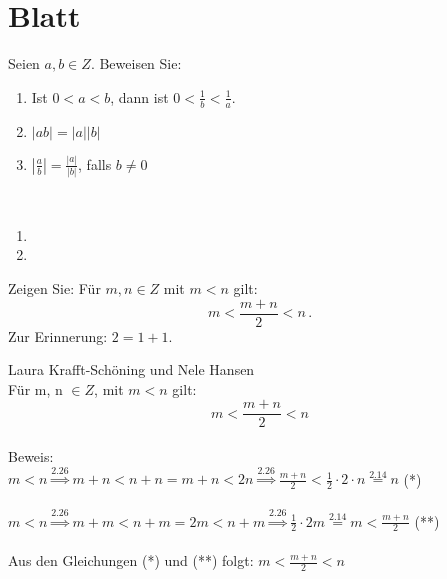 \section{Blatt}

\begin{aufg}[6 Punkte]\label{kleiner}
Seien $a,b\in Z$. Beweisen Sie: 
\begin{enumerate}[label=$\mathrm{(\roman*)}$, ref=$\mathrm{\roman*}$]
\item\label{kleineri} Ist $0<a<b$, dann ist $0<\frac1b<\frac1a$.
\item $|ab| = |a||b|$
\item $\left| \frac{a}{b} \right| = \frac{|a|}{|b|}$, falls $b\not=0$
\end{enumerate}
\end{aufg}


\bigskip

\begin{lsg}\mbox{ }
\begin{enumerate}[label=$\mathrm{(\roman*)}$, ref=$\mathrm{\roman*}$]
\item 
\item 
\end{enumerate}
\end{lsg}

\bigskip



\begin{aufg}[4 Punkte]\label{mittel}
Zeigen Sie: Für $m,n\in Z$ mit $m<n$ gilt:
\[ m<\frac{m+n}{2} < n\,.\]
Zur Erinnerung: $2 = 1+1$.
\end{aufg}
 
\bigskip 
 
\begin{lsg}[L\"osung~1]
Laura Krafft-Schöning und Nele Hansen
\\

Für m, n $ \in Z$, 
mit $m < n$ gilt:
\[m<\frac{m+n}{2}<n\] 
\\ Beweis:
\\ $m<n \overset{2.26}{\Rightarrow} m+n < n+n = m+n < 2n \overset{2.26}{\Rightarrow} \frac{m+n}{2}< \frac{1}{2}\cdot 2 \cdot n \overset{2.14}{=} n $ (*)
\\
\\$ m<n\overset{2.26}{\Rightarrow} m+m < n+m = 2m < n+m \overset{2.26}{\Rightarrow} \frac{1}{2}\cdot2m \overset{2.14}{=} m < \frac{m+n}{2} $ (**)
\\
\\ Aus den Gleichungen (*) und (**) folgt: $m<\frac{m+n}{2}<n$
\end{lsg}

